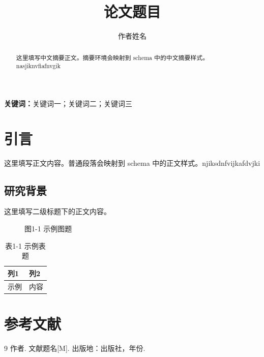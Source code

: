 \documentclass[12pt]{article}
\title{论文题目}
\author{作者姓名}
\date{}
\begin{document}
\maketitle
\begin{abstract}
这里填写中文摘要正文。摘要环境会映射到 schema 中的中文摘要样式。nasjiknvfiafnvgik
\end{abstract}
\textbf{关键词：}关键词一；关键词二；关键词三

\section{引言}
这里填写正文内容。普通段落会映射到 schema 中的正文样式。njiksdnfvijkafdvjki

\subsection{研究背景}
这里填写二级标题下的正文内容。

\begin{figure}[htbp]
\centering
\fbox{\rule{0pt}{2in}\rule{0.8\linewidth}{0pt}}
\caption{图1-1 示例图题}
\end{figure}

\begin{table}[htbp]
\centering
\caption{表1-1 示例表题}
\begin{tabular}{ll}
\toprule
列1 & 列2 \\
\midrule
示例 & 内容 \\
\bottomrule
\end{tabular}
\end{table}

\section*{参考文献}
\begin{thebibliography}{9}
 作者. 文献题名[M]. 出版地：出版社，年份.
\end{thebibliography}
\end{document}
